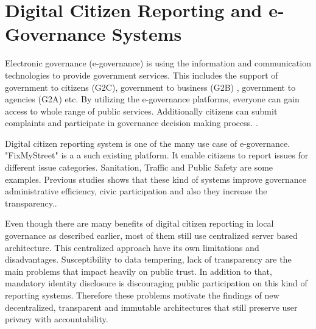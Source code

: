 \section{Digital Citizen Reporting and e-Governance Systems}

Electronic governance (e-governance) is using the information and communication technologies to provide government services. This includes the support of government to citizens (G2C), government to business (G2B) , government to agencies (G2A) etc. By utilizing the e-governance platforms, everyone can gain access to whole range of public services. Additionally citizens can submit complaints and participate in governance decision making process. \cite{9587836}.

Digital citizen reporting system is one of the many use case of e-governance. "FixMyStreet" is a a such existing platform. It enable citizens to report issues for different issue categories. Sanitation, Traffic and Public Safety are some examples. Previous studies shows that these kind of systems improve governance administrative efficiency, civic participation and also they increase the transparency.\cite{oliveira2020smartcities}.

Even though there are many benefits of digital citizen reporting in local governance as described earlier, most of them still use centralized server based architecture. This centralized approach have its own limitations and  disadvantages. Susceptibility to data tempering, lack of transparency are the main problems that impact heavily on public trust. In addition to that, mandatory identity disclosure is discouraging public participation on this kind of reporting systems. Therefore these problems motivate the findings of new decentralized, transparent and immutable architectures that still preserve user privacy with accountability.




